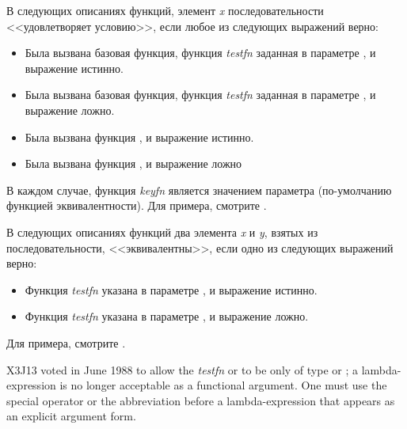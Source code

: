 В следующих описаниях функций, элемент \emph{x} последовательности
<<удовлетворяет условию>>, если любое из следующих выражений верно:
\begin{itemize}
\item
Была вызвана базовая функция, 
функция \emph{testfn} заданная в параметре , и 
выражение 
истинно.

\item
Была вызвана базовая функция, 
функция \emph{testfn}  заданная в параметре , и
выражение 
ложно.

\item
Была вызвана функция , и выражение
 истинно.

\item
Была вызвана функция , и выражение
 ложно
\end{itemize}
В каждом случае, функция \emph{keyfn} является значением параметра 
(по-умолчанию функцией эквивалентности). Для примера, смотрите .

В следующих описаниях функций
два элемента \emph{x} и \emph{y}, взятых из последовательности,
<<эквивалентны>>, если одно из следующих выражений верно:
\begin{itemize}
\item
Функция \emph{testfn} указана в параметре , и 
выражение
истинно.

\item
Функция \emph{testfn} указана в параметре , и 
выражение
ложно.
\end{itemize}
Для примера, смотрите .

\begin{newer}
X3J13 voted in June 1988  to allow the \emph{testfn}
or 
to be only of type  or ; a lambda-expression
is no longer acceptable as a functional argument.  One must use the
 special operator or the abbreviation  before
a lambda-expression that appears as an  explicit argument form.
\end{newer}

